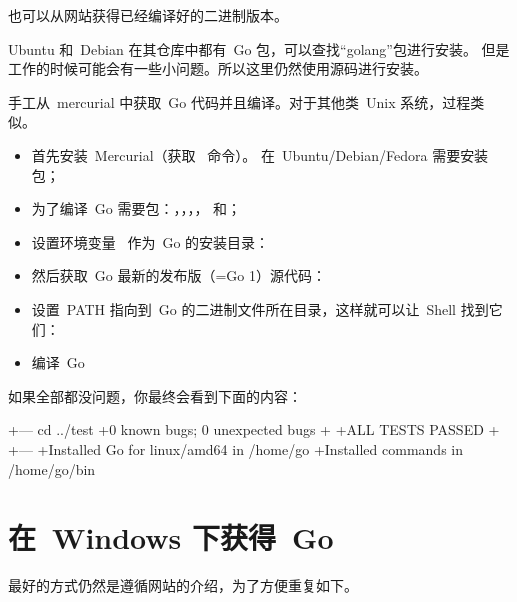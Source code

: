 也可以从网站\cite{go_install}获得已经编译好的二进制版本。

Ubuntu 和~Debian 在其仓库中都有~Go 包，可以查找``golang''包进行安装。
但是工作的时候可能会有一些小问题。所以这里仍然使用源码进行安装。

手工从~mercurial 中获取~Go 代码并且编译。对于其他类~Unix 系统，过程类似。
\begin{itemize}
\item 首先安装~Mercurial（获取~ 命令）。
在~Ubuntu/Debian/Fedora 需要安装~ 包；

\item 为了编译~Go 需要包：，，，， 和；

\item 设置环境变量~ 作为~Go 的安装目录：
\begin{display}
\pr {}
\end{display}

\item 然后获取~Go 最新的发布版（=Go 1）源代码：
\begin{display}
\pr {}
\end{display}

\item 设置~PATH 指向到~Go 的二进制文件所在目录，这样就可以让~Shell 找到它们：
\begin{display}
\pr {}
\end{display}

\item 编译~Go
\begin{display}
\pr {}
\pr {}
\end{display}
\end{itemize}
如果全部都没问题，你最终会看到下面的内容：
\begin{display}
+--- cd ../test
+0 known bugs; 0 unexpected bugs
+
+ALL TESTS PASSED
+
+---
+Installed Go for linux/amd64 in /home/go
+Installed commands in /home/go/bin
\end{display}

\section{在~Windows 下获得~Go}

最好的方式仍然是遵循网站\cite{go_install}的介绍，为了方便重复如下。

